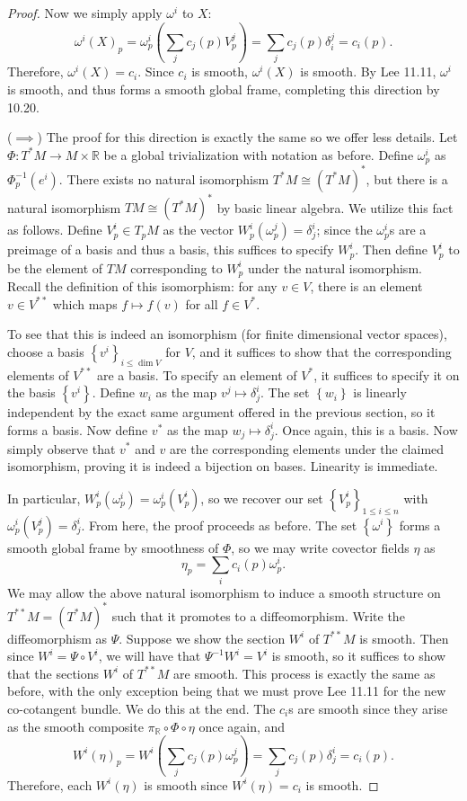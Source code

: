 \documentclass[11pt, letterpaper]{article}
\begin{document}
\begin{proof}
	Now we simply apply $\omega ^i$ to $X$:
	\[
		\omega ^i(X)_p = \omega ^i_p \left( \sum_{j} c_j(p)V^j_p \right) =\sum_{j} c_j(p) \delta _i^j = c_i(p)
	.\]
	Therefore, $\omega^i(X)=c_i$. Since $c_i$ is smooth, $\omega^i(X)$ is smooth. By Lee 11.11, $\omega ^i$ is smooth, and thus forms a smooth global frame, completing this direction by 10.20.

	($\implies $) The proof for this direction is exactly the same so we offer less details. Let $\Phi : T^*M \to M\times \mathbb{R} $ be a global trivialization with notation as before. Define $\omega ^i_p$ as $\Phi ^{-1}_p(e^i)$. There exists no natural isomorphism $T^*M \cong (T^*M)^*$, but there is a natural isomorphism $TM \cong (T^*M)^*$ by basic linear algebra. We utilize this fact as follows. Define $V^i_p\in T_pM$ as the vector $W^i_p(\omega ^j_p)=\delta ^i_j$; since the $\omega ^i_p$s are a preimage of a basis and thus a basis, this suffices to specify $W^i_p$. Then define $V^i_p$ to be the element of $TM$ corresponding to $W^i_p$ under the natural isomorphism. Recall the definition of this isomorphism: for any $v\in V$, there is an element $v\in V^{* * } $ which maps $f\mapsto f(v)$ for all $f\in V^*$.

	To see that this is indeed an isomorphism (for finite dimensional vector spaces), choose a basis $\left\{ v^i \right\}_{i \leq \dim V} $ for $V $, and it suffices to show that the corresponding elements of $V^{* *} $ are a basis. To specify an element of $V^*$, it suffices to specify it on the basis $\left\{ v^i \right\} $. Define $w_i$ as the map $v^j\mapsto \delta ^i_j$. The set $\left\{ w_i \right\} $ is linearly independent by the exact same argument offered in the previous section, so it forms a basis. Now define $v^*$ as the map $w_j \mapsto \delta ^i_j$. Once again, this is a basis. Now simply observe that $v^*$ and $v$ are the corresponding elements under the claimed isomorphism, proving it is indeed a bijection on bases. Linearity is immediate.

	In particular, $W^i_p(\omega^i_p)=\omega ^i_p(V^i_p)$, so we recover our set $\left\{ V^i_p \right\}_{1\leq i\leq n} $ with $\omega ^i_p(V^j_p)=\delta ^i_j$. From here, the proof proceeds as before. The set $\left\{ \omega ^i \right\} $ forms a smooth global frame by smoothness of $\Phi $, so we may write covector fields $\eta $ as
	\[
		\eta_p = \sum_{i} c_i(p) \omega ^i_p
	.\]
	We may allow the above natural isomorphism to induce a smooth structure on $T^{* *} M = (T^*M)^*$ such that it promotes to a diffeomorphism. Write the diffeomorphism as $\Psi $. Suppose we show the section $W^i$ of $T^{* *} M$ is smooth. Then since $W^i = \Psi \circ V^i$, we will have that $\Psi ^{-1} W^i = V^i$ is smooth, so it suffices to show that the sections $W^i$ of $T^{* *} M$ are smooth. This process is exactly the same as before, with the only exception being that we must prove Lee 11.11 for the new co-cotangent bundle. We do this at the end. The $c_i$s are smooth since they arise as the smooth composite $\pi _\mathbb{R} \circ \Phi \circ \eta $ once again, and
	\[
		W^i(\eta)_p = W^i \left( \sum_{j} c_j(p)\omega _p^j \right) =\sum_{j} c_j(p)\delta ^i_j = c_i(p)
	.\]
	Therefore, each $W^i(\eta )$ is smooth since $W^i(\eta )=c_i$ is smooth.


\end{proof}
\end{document}
